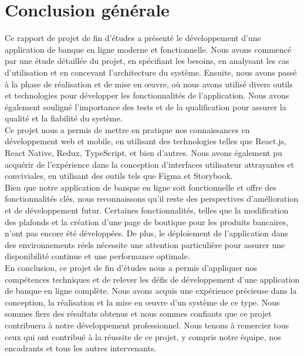 \chapter*{Conclusion générale}
Ce rapport de projet de fin d'études a présenté le développement d'une application de banque en ligne moderne et fonctionnelle. Nous avons commencé par une étude détaillée du projet, en spécifiant les besoins, en analysant les cas d'utilisation et en concevant l'architecture du système. Ensuite, nous avons passé à la phase de réalisation et de mise en œuvre, où nous avons utilisé divers outils et technologies pour développer les fonctionnalités de l'application. Nous avons également souligné l'importance des tests et de la qualification pour assurer la qualité et la fiabilité du système.\\

Ce projet nous a permis de mettre en pratique nos connaissances en développement web et mobile, en utilisant des technologies telles que React.js, React Native, Redux, TypeScript, et bien d'autres. Nous avons également pu acquérir de l'expérience dans la conception d'interfaces utilisateur attrayantes et conviviales, en utilisant des outils tels que Figma et Storybook.\\

Bien que notre application de banque en ligne soit fonctionnelle et offre des fonctionnalités clés, nous reconnaissons qu'il reste des perspectives d'amélioration et de développement futur. Certaines fonctionnalités, telles que la modification des plafonds et la création d'une page de boutique pour les produits bancaires, n'ont pas encore été développées. De plus, le déploiement de l'application dans des environnements réels nécessite une attention particulière pour assurer une disponibilité continue et une performance optimale.\\

En conclusion, ce projet de fin d'études nous a permis d'appliquer nos compétences techniques et de relever les défis de développement d'une application de banque en ligne complète. Nous avons acquis une expérience précieuse dans la conception, la réalisation et la mise en œuvre d'un système de ce type. Nous sommes fiers des résultats obtenus et nous sommes confiants que ce projet contribuera à notre développement professionnel. Nous tenons à remercier tous ceux qui ont contribué à la réussite de ce projet, y compris notre équipe, nos encadrants et tous les autres intervenants.